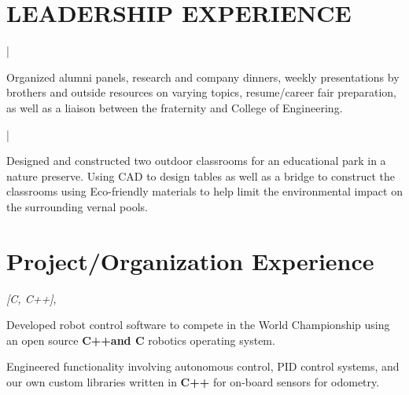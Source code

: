 \documentclass[letterpaper]{deedy-resume}
\begin{document}
\begin{minipage}[t]{0.69\textwidth}
\sectionspace

\section{LEADERSHIP EXPERIENCE}

\sectionspace

 |

\begin{tightitemize}
\item Organized alumni panels, research and company dinners, weekly presentations by brothers and outside resources on varying topics, resume/career fair preparation, as well as a liaison between the fraternity and College of Engineering.
\end{tightitemize}

\sectionspace 

 |

\begin{tightitemize}
\item Designed and constructed two outdoor classrooms for an educational park in a nature preserve. Using CAD to design tables as well as a bridge to construct the classrooms using Eco-friendly materials to help limit the environmental impact on the surrounding vernal pools.
\end{tightitemize}


\sectionspace 

\section{Project/Organization Experience}

 \emph{[C, C++]}, \\
\begin{tightitemize}
\item Developed robot control software to compete in the World Championship using an open source \textbf{C++and C} robotics operating system. 
\item Engineered functionality involving autonomous control, PID control systems, and our own custom libraries written in \textbf{C++} for on-board sensors for odometry.
\end{tightitemize}
\sectionspace 


\end{minipage}
\end{document}
